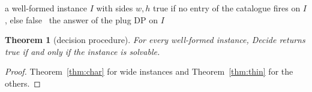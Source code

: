\documentclass[11pt]{article}
\newtheorem{theorem}{Theorem}
\begin{document}
\begin{algorithm}[htbp]
\caption{Decide$(I)$}\label{alg:decide}
\begin{algorithmic}[1]
\Require a well-formed instance $I$ with sides $w,h$
 \Return true if no entry of the catalogue fires on $I$,
  else false
\Else\ \Return the answer of the plug DP on $I$
\EndIf
\end{algorithmic}
\end{algorithm}

\begin{theorem}[decision procedure]\label{thm:decide}
For every well-formed instance, Decide returns true if and only if the instance is solvable.
\end{theorem}
\begin{proof}
Theorem~\ref{thm:char} for wide instances and Theorem~\ref{thm:thin} for the others.
\end{proof}
\end{document}
